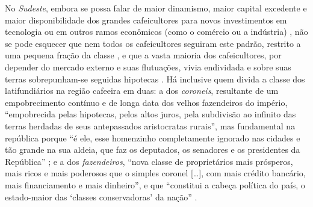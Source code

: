 No \textit{Sudeste}, embora se possa falar de maior dinamismo, maior capital excedente e maior disponibilidade dos grandes cafeicultores para novos investimentos em tecnologia ou em outros ramos econômicos (como o comércio ou a indústria) \cite[p.~153-154]{CARONE1970inst}, não se pode esquecer que nem todos os cafeicultores seguiram este padrão, restrito a uma pequena fração da classe \cite[p.~32-38]{gorender_burguesia_1990}, e que a vasta maioria dos cafeicultores, por depender do mercado externo e suas flutuações, vivia endividada e sobre suas terras sobrepunham-se seguidas hipotecas \cite[p.~154]{CARONE1970inst}. Há inclusive quem divida a classe dos latifundiários na região cafeeira em duas: a dos \textit{coroneis}, resultante de um empobrecimento contínuo e de longa data dos velhos fazendeiros do império, ``empobrecida pelas hipotecas, pelos altos juros, pela subdivisão ao infinito das terras herdadas de seus antepassados aristocratas rurais'', mas fundamental na república porque ``é ele, esse homenzinho completamente ignorado nas cidades e tão grande na sua aldeia, que faz os deputados, os senadores e os presidentes da República'' \cite[pp.~146-148]{basbaum_histsinc_1967} ; e a dos \textit{fazendeiros}, ``nova classe de proprietários mais prósperos, mais ricos e mais poderosos que o simples coronel [\dots], com mais crédito bancário, mais financiamento e mais dinheiro'', e que ``constitui a cabeça política do país, o estado-maior das `classes conservadoras' da nação'' \cite[p.~149]{basbaum_histsinc_1967}.

